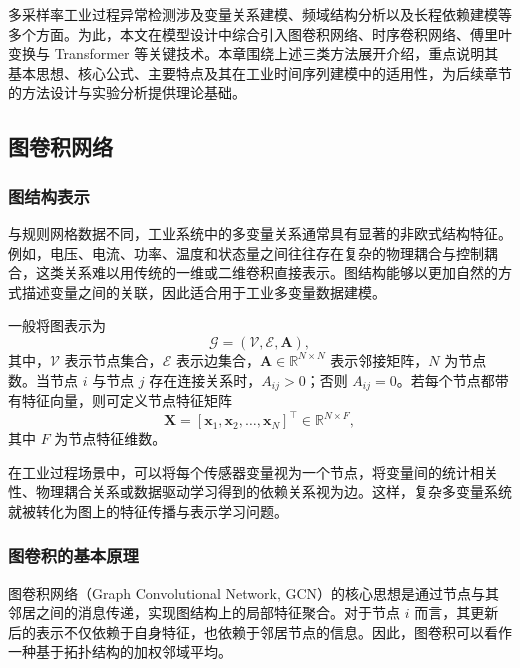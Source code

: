 \documentclass[bachelor, vlined]{DissertUESTC}
\begin{document}
    多采样率工业过程异常检测涉及变量关系建模、频域结构分析以及长程依赖建模等多个方面。为此，本文在模型设计中综合引入图卷积网络、时序卷积网络、傅里叶变换与 Transformer 等关键技术。本章围绕上述三类方法展开介绍，重点说明其基本思想、核心公式、主要特点及其在工业时间序列建模中的适用性，为后续章节的方法设计与实验分析提供理论基础。

    \subsection{图卷积网络}

    \subsubsection{图结构表示}

    与规则网格数据不同，工业系统中的多变量关系通常具有显著的非欧式结构特征。例如，电压、电流、功率、温度和状态量之间往往存在复杂的物理耦合与控制耦合，这类关系难以用传统的一维或二维卷积直接表示。图结构能够以更加自然的方式描述变量之间的关联，因此适合用于工业多变量数据建模。

    一般将图表示为
    \begin{equation}
        \mathcal{G} = (\mathcal{V}, \mathcal{E}, \mathbf{A}),
    \end{equation}
    其中，$\mathcal{V}$ 表示节点集合，$\mathcal{E}$ 表示边集合，$\mathbf{A} \in \mathbb{R}^{N \times N}$ 表示邻接矩阵，$N$ 为节点数。当节点 $i$ 与节点 $j$ 存在连接关系时，$A_{ij} > 0$；否则 $A_{ij} = 0$。若每个节点都带有特征向量，则可定义节点特征矩阵
    \begin{equation}
        \mathbf{X} = [\mathbf{x}_1, \mathbf{x}_2, \ldots, \mathbf{x}_N]^\top \in \mathbb{R}^{N \times F},
    \end{equation}
    其中 $F$ 为节点特征维数。

    在工业过程场景中，可以将每个传感器变量视为一个节点，将变量间的统计相关性、物理耦合关系或数据驱动学习得到的依赖关系视为边。这样，复杂多变量系统就被转化为图上的特征传播与表示学习问题。

    \subsubsection{图卷积的基本原理}

    图卷积网络（Graph Convolutional Network, GCN）的核心思想是通过节点与其邻居之间的消息传递，实现图结构上的局部特征聚合。对于节点 $i$ 而言，其更新后的表示不仅依赖于自身特征，也依赖于邻居节点的信息。因此，图卷积可以看作一种基于拓扑结构的加权邻域平均。
\end{document}
